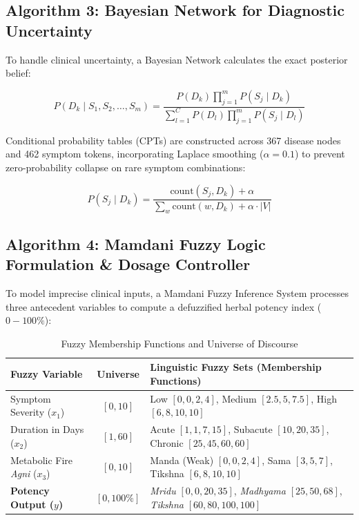 \documentclass[12pt,a4paper]{article}
\begin{document}
\subsection{Algorithm 3: Bayesian Network for Diagnostic Uncertainty}
To handle clinical uncertainty, a Bayesian Network calculates the exact posterior belief:

\begin{equation}
P(D_k \mid S_1, S_2, \dots, S_m) = \frac{P(D_k) \prod_{j=1}^{m} P(S_j \mid D_k)}{\sum_{l=1}^{C} P(D_l) \prod_{j=1}^{m} P(S_j \mid D_l)}
\end{equation}

Conditional probability tables (CPTs) are constructed across 367 disease nodes and 462 symptom tokens, incorporating Laplace smoothing ($\alpha = 0.1$) to prevent zero-probability collapse on rare symptom combinations:

\begin{equation}
P(S_j \mid D_k) = \frac{\text{count}(S_j, D_k) + \alpha}{\sum_{w} \text{count}(w, D_k) + \alpha \cdot |V|}
\end{equation}

\subsection{Algorithm 4: Mamdani Fuzzy Logic Formulation \& Dosage Controller}
To model imprecise clinical inputs, a Mamdani Fuzzy Inference System processes three antecedent variables to compute a defuzzified herbal potency index ($0-100\%$):

\begin{table}[H]
\centering
\caption{Fuzzy Membership Functions and Universe of Discourse}
\label{tab:fuzzymf}
\begin{tabular}{|l|c|l|}
\hline
\textbf{Fuzzy Variable} & \textbf{Universe} & \textbf{Linguistic Fuzzy Sets (Membership Functions)} \\
\hline
Symptom Severity ($x_1$) & $[0, 10]$ & Low $[0, 0, 2, 4]$, Medium $[2.5, 5, 7.5]$, High $[6, 8, 10, 10]$ \\
Duration in Days ($x_2$) & $[1, 60]$ & Acute $[1, 1, 7, 15]$, Subacute $[10, 20, 35]$, Chronic $[25, 45, 60, 60]$ \\
Metabolic Fire \textit{Agni} ($x_3$) & $[0, 10]$ & Manda (Weak) $[0, 0, 2, 4]$, Sama $[3, 5, 7]$, Tikshna $[6, 8, 10, 10]$ \\
\hline
\textbf{Potency Output ($y$)} & $[0, 100\%]$ & \textit{Mridu} $[0, 0, 20, 35]$, \textit{Madhyama} $[25, 50, 68]$, \textit{Tikshna} $[60, 80, 100, 100]$ \\
\hline
\end{tabular}
\end{table}
\end{document}
